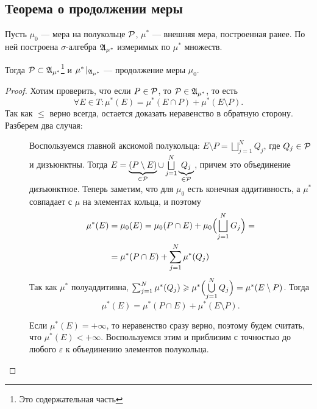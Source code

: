 \subsection{Теорема о продолжении меры}
\begin{thm}
    Пусть $ \mu _0$ --- мера на полукольце $ \P$, $ \mu ^{*}$ --- внешняя мера, построенная ранее. По ней построена  $ \sigma $-алгебра $ \A_{\mu^{*}}$ измеримых по $ \mu ^{*}$ множеств.

	Тогда $ \P \subset \A_{\mu^{*}}$\footnote{Это содержательная часть} и $ \mu ^{*}\!\mid_{\A_{\mu^{*}}}$ --- продолжение меры $ \mu_0$.
\end{thm}
\begin{proof}
	Хотим проверить, что если $ P \in \P$, то  $ \P \in \A_{\mu^{*}}$, то есть
	\[
		\forall E \in T\colon \mu ^{*}(E)= \mu ^{*}(E \cap P) + \mu^*( E \setminus P )
	.\] 
	Так как $ \le $ верно всегда, остается доказать неравенство в обратную сторону. 
	Разберем два случая:
	\begin{description}
		\item[] Воспользуемся главной аксиомой полукольца:
			$E \setminus P = \bigsqcup\limits_{j=1}^{N} Q_j$, где $ Q_j \in \P$ и дизъюнктны.
			Тогда $ E = \underbrace{(P \setminus E)}_{ \in \P} \cup \bigsqcup\limits_{j=1}^{N} \underbrace{Q_j}_{ \in \P}$, причем это объединение дизъюнктное. Теперь заметим, что для $ \mu_0$ есть конечная аддитивность, а $ \mu^*$ совпадает с $ \mu$ на элементах кольца, и поэтому
			\[
			\begin{aligned}
				\mu^*( E )  &= \mu_0(E) = \mu_0(P \cap E) + \mu_0 \Bigl( \bigsqcup\limits_{j=1}^{N} G_j \Bigr) = \\
							&= \mu^*( P \cap E ) + \sum_{j=1}^{N} \mu^*( Q_j ) 
			\end{aligned}
			\]
			Так как $ \mu^*$ полуаддитивна, $ \sum_{j=1}^{N} \mu^*( Q_j )  \ge \mu^*\Bigl( \bigcup\limits_{j=1}^{N} Q_j \Bigr) = \mu^*( E \setminus P )$. Тогда 
			\[
			\mu^*( E  )= \mu^*( P\cap E ) + \mu^*(E\setminus P) 
			.\] 
		\item[] Если $ \mu^*( E ) = +\infty$, то неравенство сразу верно, поэтому будем считать, что $ \mu^*( E ) < +\infty$. Воспользуемся этим и приблизим с точностью до любого $ \varepsilon $ к объединению элементов полукольца.


\end{description}
\end{proof}
